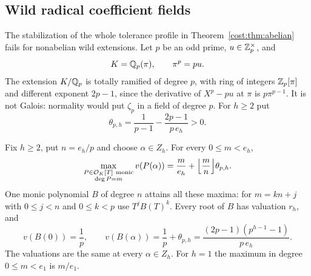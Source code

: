 \subsection{Wild radical coefficient fields}\label{cost:sec:radical}
{\raggedright{}}

The stabilization of the whole tolerance profile in Theorem~\ref{cost:thm:abelian} fails for
nonabelian wild extensions. Let $p$ be an odd prime, $u\in\mathbb{Z}_p^\times$, and
\[
 K=\mathbb{Q}_p(\pi),\qquad\pi^p=pu.
\]
The extension $K/\mathbb{Q}_p$ is totally ramified of degree $p$, with ring of integers
$\mathbb{Z}_p[\pi]$ and different exponent $2p-1$, since the derivative of $X^p-pu$ at $\pi$ is
$p\pi^{p-1}$. It is not Galois: normality would put $\zeta_p$ in a field of degree $p$.
For $h\ge2$ put
\[
 \theta_{p,h}=\frac1{p-1}-\frac{2p-1}{p\,e_h}>0 .
\]

\begin{theorem}\label{cost:thm:approx}
Fix $h\ge2$, put $n=e_h/p$ and choose $\alpha\in Z_h$. For every $0\le m<e_h$,
\begin{equation}\label{cost:eq:approx}
 \max_{\substack{P\in\OO_K[T]\ \mathrm{monic}\\ \deg P=m}}v(P(\alpha))
 =\frac m{e_h}+\floor*{\frac mn}\theta_{p,h}.
\end{equation}
One monic polynomial $B$ of degree $n$ attains all these maxima: for $m=kn+j$ with
$0\le j<n$ and $0\le k<p$ use $T^jB(T)^k$. Every root of $B$ has valuation $r_h$, and
\[
 v(B(0))=\frac1p,\qquad
 v(B(\alpha))=\frac1p+\theta_{p,h}=\frac{(2p-1)(p^{h-1}-1)}{p\,e_h}.
\]
The valuations are the same at every $\alpha\in Z_h$. For $h=1$ the maximum in degree
$0\le m<e_1$ is $m/e_1$.
\end{theorem}

